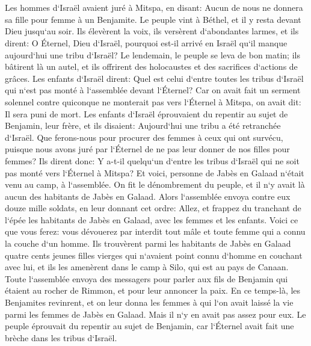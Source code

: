 \chapter{}

\verse Les hommes d`Israël avaient juré à Mitspa, en disant: Aucun de nous ne donnera sa fille pour femme à un Benjamite. 
\verse Le peuple vint à Béthel, et il y resta devant Dieu jusqu`au soir. Ils élevèrent la voix, ils versèrent d`abondantes larmes, 
\verse et ils dirent: O Éternel, Dieu d`Israël, pourquoi est-il arrivé en Israël qu`il manque aujourd`hui une tribu d`Israël? 
\verse Le lendemain, le peuple se leva de bon matin; ils bâtirent là un autel, et ils offrirent des holocaustes et des sacrifices d`actions de grâces. 
\verse Les enfants d`Israël dirent: Quel est celui d`entre toutes les tribus d`Israël qui n`est pas monté à l`assemblée devant l`Éternel? Car on avait fait un serment solennel contre quiconque ne monterait pas vers l`Éternel à Mitspa, on avait dit: Il sera puni de mort. 
\verse Les enfants d`Israël éprouvaient du repentir au sujet de Benjamin, leur frère, et ils disaient: Aujourd`hui une tribu a été retranchée d`Israël. 
\verse Que ferons-nous pour procurer des femmes à ceux qui ont survécu, puisque nous avons juré par l`Éternel de ne pas leur donner de nos filles pour femmes? 
\verse Ils dirent donc: Y a-t-il quelqu`un d`entre les tribus d`Israël qui ne soit pas monté vers l`Éternel à Mitspa? Et voici, personne de Jabès en Galaad n`était venu au camp, à l`assemblée. 
\verse On fit le dénombrement du peuple, et il n`y avait là aucun des habitants de Jabès en Galaad. 
\verse Alors l`assemblée envoya contre eux douze mille soldats, en leur donnant cet ordre: Allez, et frappez du tranchant de l`épée les habitants de Jabès en Galaad, avec les femmes et les enfants. 
\verse Voici ce que vous ferez: vous dévouerez par interdit tout mâle et toute femme qui a connu la couche d`un homme. 
\verse Ils trouvèrent parmi les habitants de Jabès en Galaad quatre cents jeunes filles vierges qui n`avaient point connu d`homme en couchant avec lui, et ils les amenèrent dans le camp à Silo, qui est au pays de Canaan. 
\verse Toute l`assemblée envoya des messagers pour parler aux fils de Benjamin qui étaient au rocher de Rimmon, et pour leur annoncer la paix. 
\verse En ce temps-là, les Benjamites revinrent, et on leur donna les femmes à qui l`on avait laissé la vie parmi les femmes de Jabès en Galaad. Mais il n`y en avait pas assez pour eux. 
\verse Le peuple éprouvait du repentir au sujet de Benjamin, car l`Éternel avait fait une brèche dans les tribus d`Israël. 
